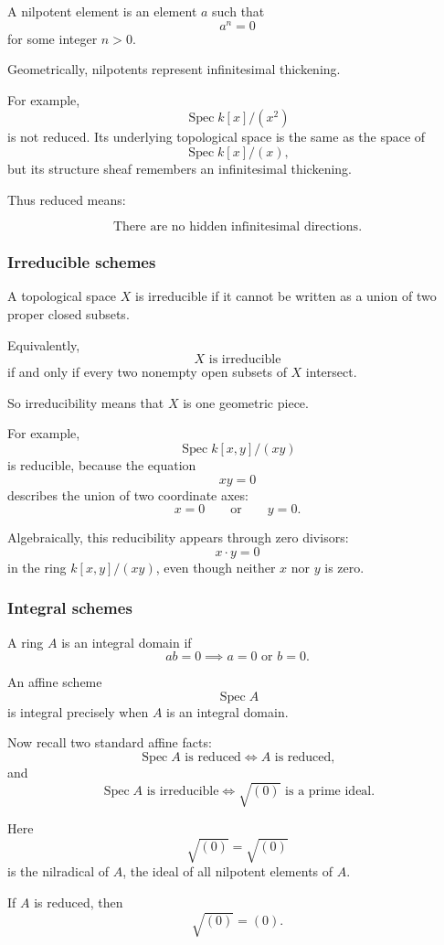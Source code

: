 \documentclass[12pt,a4paper]{article}
\DeclareMathOperator{\Spec}{Spec}
\newcommand{\nilrad}{\sqrt{(0)}}
\providecommand{\Spec}{\operatorname{Spec}}
\theoremstyle{notespace}
\begin{document}
A nilpotent element is an element \(a\) such that
\[
a^n=0
\]
for some integer \(n>0\).

Geometrically, nilpotents represent infinitesimal thickening.

For example,
\[
\Spec k[x]/(x^2)
\]
is not reduced. Its underlying topological space is the same as the space of
\[
\Spec k[x]/(x),
\]
but its structure sheaf remembers an infinitesimal thickening.

Thus reduced means:

\[
\boxed{
	\text{There are no hidden infinitesimal directions.}
}
\]

\subsubsection*{Irreducible schemes}

A topological space \(X\) is irreducible if it cannot be written as a union of two proper closed subsets.

Equivalently,
\[
X\text{ is irreducible}
\]
if and only if every two nonempty open subsets of \(X\) intersect.

So irreducibility means that \(X\) is one geometric piece.

For example,
\[
\Spec k[x,y]/(xy)
\]
is reducible, because the equation
\[
xy=0
\]
describes the union of two coordinate axes:
\[
x=0
\qquad\text{or}\qquad
y=0.
\]

Algebraically, this reducibility appears through zero divisors:
\[
x\cdot y=0
\]
in the ring \(k[x,y]/(xy)\), even though neither \(x\) nor \(y\) is zero.

\subsubsection*{Integral schemes}

A ring \(A\) is an integral domain if
\[
ab=0
\implies
a=0\text{ or }b=0.
\]

An affine scheme
\[
\Spec A
\]
is integral precisely when \(A\) is an integral domain.

Now recall two standard affine facts:
\[
\Spec A\text{ is reduced}
\iff
A\text{ is reduced},
\]
and
\[
\Spec A\text{ is irreducible}
\iff
\nilrad\text{ is a prime ideal}.
\]

Here
\[
\nilrad=\sqrt{(0)}
\]
is the nilradical of \(A\), the ideal of all nilpotent elements of \(A\).

If \(A\) is reduced, then
\[
\sqrt{(0)}=(0).
\]
\end{document}
